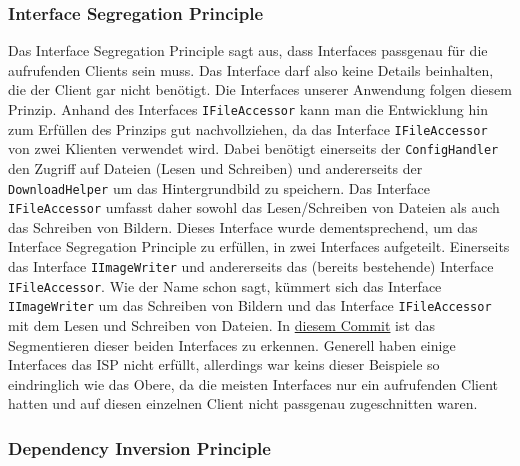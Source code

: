 \subsubsection{Interface Segregation Principle}
Das Interface Segregation Principle sagt aus, dass Interfaces passgenau für die aufrufenden Clients sein muss. Das Interface darf also keine Details beinhalten, die der Client gar nicht benötigt.
Die Interfaces unserer Anwendung folgen diesem Prinzip. Anhand des Interfaces \texttt{IFileAccessor} kann man die Entwicklung hin zum Erfüllen des Prinzips gut nachvollziehen, da das Interface \texttt{IFileAccessor} von zwei Klienten verwendet wird. Dabei benötigt einerseits der \texttt{ConfigHandler} den Zugriff auf Dateien (Lesen und Schreiben) und andererseits der \texttt{DownloadHelper} um das Hintergrundbild zu speichern. Das Interface \texttt{IFileAccessor} umfasst daher sowohl das Lesen/Schreiben von Dateien als auch das Schreiben von Bildern. Dieses Interface wurde dementsprechend, um das Interface Segregation Principle zu erfüllen, in zwei Interfaces aufgeteilt. Einerseits das Interface \texttt{IImageWriter} und andererseits das (bereits bestehende) Interface \texttt{IFileAccessor}. Wie der Name schon sagt, kümmert sich das Interface \texttt{IImageWriter} um das Schreiben von Bildern und das Interface \texttt{IFileAccessor} mit dem Lesen und Schreiben von Dateien. In \href{https://github.com/Bronzila/WeatherWallpaper/commit/8db38466c2185e16ef90f71af485e00b57b09032}{\color{blue}diesem Commit} ist das Segmentieren dieser beiden Interfaces zu erkennen.
Generell haben einige Interfaces das ISP nicht erfüllt, allerdings war keins dieser Beispiele so eindringlich wie das Obere, da die meisten Interfaces nur ein aufrufenden Client hatten und auf diesen einzelnen Client nicht passgenau zugeschnitten waren.
\subsubsection{Dependency Inversion Principle}

